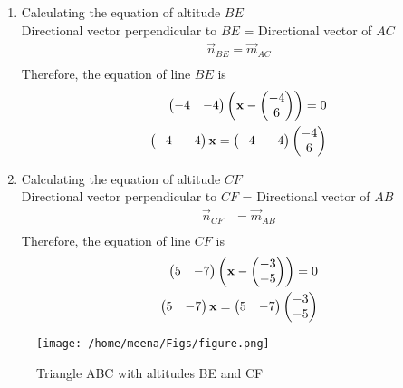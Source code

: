 \documentclass[12pt]{article}
\begin{document}
\begin{enumerate}
\item Calculating the equation of altitude $BE$\\
Directional vector perpendicular to $BE$ = Directional vector of $AC$
\begin{align}
\vec{n}_{BE} = \vec{m}_{AC}\\
\end{align}
Therefore, the equation of line $BE$ is
\begin{align}
\begin{pmatrix}-4&-4\end{pmatrix}\left(\mathbf{x}-\begin{pmatrix}-4\\6\\\end{pmatrix}\right)=0\\
\begin{pmatrix}-4&-4\end{pmatrix}\mathbf{x}=\begin{pmatrix}-4&-4\end{pmatrix}\begin{pmatrix}-4\\6\\\end{pmatrix}\\
\end{align}
\item Calculating the equation of altitude $CF$\\
Directional vector perpendicular to $CF$ = Directional vector of $AB$
\begin{align}
\vec{n}_{CF} &= \vec{m}_{AB}\\
\end{align}
Therefore, the equation of line $CF$ is 
\begin{align}
\begin{pmatrix}5&-7\end{pmatrix}\left(\mathbf{x}-\begin{pmatrix}-3\\-5\\\end{pmatrix}\right)=0\\
\begin{pmatrix}5&-7\end{pmatrix}\mathbf{x}=\begin{pmatrix}5&-7\end{pmatrix}\begin{pmatrix}-3\\-5\\\end{pmatrix}\\
\end{align}
\end{enumerate}
\begin{figure} [htbp]
\texttt{[image: /home/meena/Figs/figure.png]}
\caption{Triangle ABC with altitudes BE and CF}
\label{fig}
\end{figure}
\end{document}
